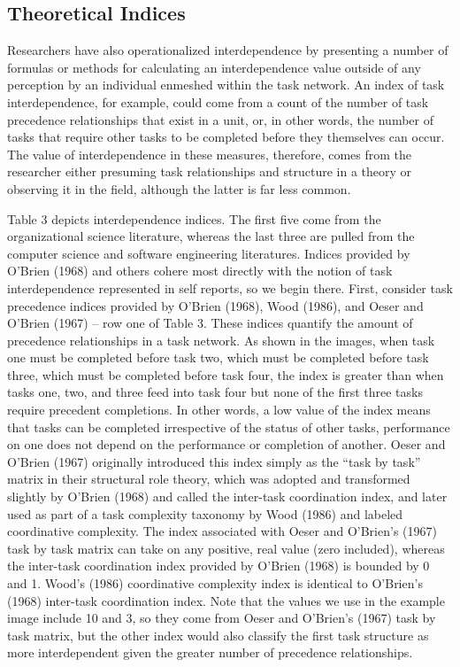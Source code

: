 \documentclass[english,,man]{apa6}
\theoremstyle{definition}
\theoremstyle{definition}
\theoremstyle{definition}
\theoremstyle{remark}
\begin{document}
\hypertarget{theoretical-indices}{%
\subsection{Theoretical Indices}\label{theoretical-indices}}

Researchers have also operationalized interdependence by presenting a
number of formulas or methods for calculating an interdependence value
outside of any perception by an individual enmeshed within the task
network. An index of task interdependence, for example, could come from
a count of the number of task precedence relationships that exist in a
unit, or, in other words, the number of tasks that require other tasks
to be completed before they themselves can occur. The value of
interdependence in these measures, therefore, comes from the researcher
either presuming task relationships and structure in a theory or
observing it in the field, although the latter is far less common.

Table 3 depicts interdependence indices. The first five come from the
organizational science literature, whereas the last three are pulled
from the computer science and software engineering literatures. Indices
provided by O'Brien (1968) and others cohere most directly with the
notion of task interdependence represented in self reports, so we begin
there. First, consider task precedence indices provided by O'Brien
(1968), Wood (1986), and Oeser and O'Brien (1967) -- row one of Table 3.
These indices quantify the amount of precedence relationships in a task
network. As shown in the images, when task one must be completed before
task two, which must be completed before task three, which must be
completed before task four, the index is greater than when tasks one,
two, and three feed into task four but none of the first three tasks
require precedent completions. In other words, a low value of the index
means that tasks can be completed irrespective of the status of other
tasks, performance on one does not depend on the performance or
completion of another. Oeser and O'Brien (1967) originally introduced
this index simply as the \enquote{task by task} matrix in their
structural role theory, which was adopted and transformed slightly by
O'Brien (1968) and called the inter-task coordination index, and later
used as part of a task complexity taxonomy by Wood (1986) and labeled
coordinative complexity. The index associated with Oeser and O'Brien's
(1967) task by task matrix can take on any positive, real value (zero
included), whereas the inter-task coordination index provided by O'Brien
(1968) is bounded by 0 and 1. Wood's (1986) coordinative complexity
index is identical to O'Brien's (1968) inter-task coordination index.
Note that the values we use in the example image include 10 and 3, so
they come from Oeser and O'Brien's (1967) task by task matrix, but the
other index would also classify the first task structure as more
interdependent given the greater number of precedence relationships.
\end{document}
